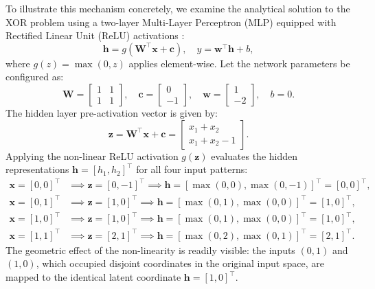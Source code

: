 \documentclass[../../main.tex]{subfiles}
\begin{document}
To illustrate this mechanism concretely, we examine the analytical solution to the XOR problem using a two-layer Multi-Layer Perceptron (MLP) equipped with Rectified Linear Unit ($\text{ReLU}$) activations \citep{goodfellow2016}:
\begin{equation}
\mathbf{h} = g\left(\mathbf{W}^\top \mathbf{x} + \mathbf{c}\right), \quad y = \mathbf{w}^\top \mathbf{h} + b,
\end{equation}
where $g(z) = \max(0, z)$ applies element-wise. Let the network parameters be configured as:
\begin{equation}
\mathbf{W} = \begin{bmatrix} 1 & 1 \\ 1 & 1 \end{bmatrix}, \quad \mathbf{c} = \begin{bmatrix} 0 \\ -1 \end{bmatrix}, \quad \mathbf{w} = \begin{bmatrix} 1 \\ -2 \end{bmatrix}, \quad b = 0.
\end{equation}
The hidden layer pre-activation vector is given by:
\begin{equation}
\mathbf{z} = \mathbf{W}^\top \mathbf{x} + \mathbf{c} = \begin{bmatrix} x_1 + x_2 \\ x_1 + x_2 - 1 \end{bmatrix}.
\end{equation}
Applying the non-linear ReLU activation $g(\mathbf{z})$ evaluates the hidden representations $\mathbf{h} = [h_1, h_2]^\top$ for all four input patterns:
\begin{align}
\mathbf{x} = [0, 0]^\top &\implies \mathbf{z} = [0, -1]^\top \implies \mathbf{h} = [\max(0, 0), \max(0, -1)]^\top = [0, 0]^\top, \\
\mathbf{x} = [0, 1]^\top &\implies \mathbf{z} = [1, 0]^\top \implies \mathbf{h} = [\max(0, 1), \max(0, 0)]^\top = [1, 0]^\top, \\
\mathbf{x} = [1, 0]^\top &\implies \mathbf{z} = [1, 0]^\top \implies \mathbf{h} = [\max(0, 1), \max(0, 0)]^\top = [1, 0]^\top, \\
\mathbf{x} = [1, 1]^\top &\implies \mathbf{z} = [2, 1]^\top \implies \mathbf{h} = [\max(0, 2), \max(0, 1)]^\top = [2, 1]^\top.
\end{align}
The geometric effect of the non-linearity is readily visible: the inputs $(0,1)$ and $(1,0)$, which occupied disjoint coordinates in the original input space, are mapped to the identical latent coordinate $\mathbf{h} = [1, 0]^\top$.
\end{document}
